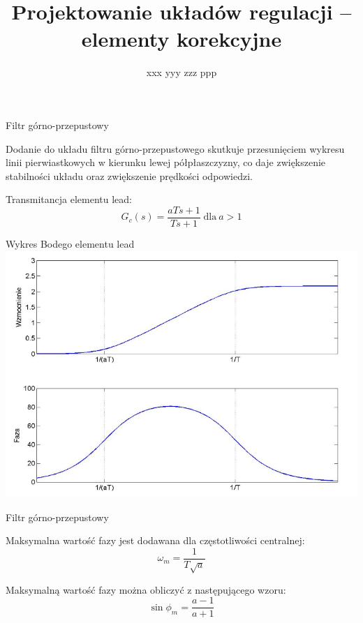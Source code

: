 \documentclass{beamer}
\title[\insertframenumber/\inserttotalframenumber]{Projektowanie układów regulacji – elementy korekcyjne}
\author{xxx yyy zzz ppp}
\institute{Akademia Górniczo-Hutnicza \\ Kraków}
\begin{document}
\begin{frame}
  \titlepage
\end{frame}


\begin{frame}{Filtr górno-przepustowy}


Dodanie do układu filtru górno-przepustowego skutkuje przesunięciem wykresu linii pierwiastkowych w kierunku
lewej półpłaszczyzny, co daje zwiększenie stabilności układu oraz zwiększenie prędkości
odpowiedzi.

Transmitancja elementu lead:
\begin{equation*}
G_{c}(s) = \frac{aTs + 1}{T s + 1}  \;\text{dla}\: a>1
\end{equation*}


\end{frame}


\begin{frame}{Wykres Bodego elementu lead}
\includegraphics[width = \linewidth]{lead}
\end{frame}

\begin{frame}{Filtr górno-przepustowy}

	Maksymalna wartość fazy jest dodawana dla częstotliwości centralnej:
	\begin{equation*}
	\omega_{m} = \frac{1}{T \sqrt{a}}
	\end{equation*}
	
	Maksymalną wartość fazy można obliczyć z następującego wzoru:
	\begin{equation*}
	\sin{\phi_{m}} = \frac{a-1}{a+1}
	\end{equation*}
\end{frame}
\end{document}
